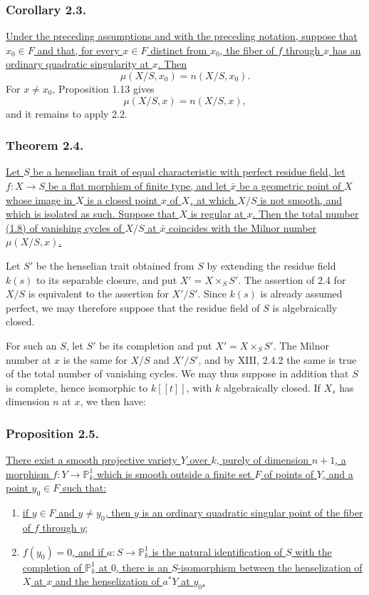 \subsubsection*{Corollary 2.3.}
\underline{Under the preceding assumptions and with the preceding
notation, suppose that $x_0\in F$ and that, for every
$x\in F$ distinct from $x_0$, the fiber of $f$ through $x$ has an
ordinary quadratic singularity at $x$.  Then}
\[
\mu(X/S,x_0)=n(X/S,x_0).
\]
For $x\ne x_0$, Proposition 1.13 gives
\[
\mu(X/S,x)=n(X/S,x),
\]
and it remains to apply 2.2.

\subsubsection*{Theorem 2.4.}
\underline{Let $S$ be a henselian trait of equal characteristic with
perfect residue field, let $f:X\to S$ be a flat morphism of finite
type, and let $\bar x$ be a geometric point of $X$ whose image in
$X$ is a closed point $x$ of $X_s$ at which $X/S$ is not smooth,
and which is isolated as such.  Suppose that $X$ is regular at $x$.
Then the total number (1.8) of vanishing cycles of $X/S$ at $\bar x$
coincides with the Milnor number $\mu(X/S,x)$.}

Let $S'$ be the henselian trait obtained from $S$ by extending the
residue field $k(s)$ to its separable closure, and put
$X'=X\times_S S'$.  The assertion of 2.4 for $X/S$ is equivalent to
the assertion for $X'/S'$.  Since $k(s)$ is already assumed perfect,
we may therefore suppose that the residue field of $S$ is
algebraically closed.

For such an $S$, let $S'$ be its completion and put
$X'=X\times_S S'$.  The Milnor number at $x$ is the same for $X/S$
and $X'/S'$, and by XIII, 2.4.2 the same is true of the total number
of vanishing cycles.  We may thus suppose in addition that $S$ is
complete, hence isomorphic to $k[[t]]$, with $k$ algebraically
closed.  If $X_s$ has dimension $n$ at $x$, we then have:

\subsubsection*{Proposition 2.5.}
\underline{There exist a smooth projective variety $Y$ over $k$,
purely of dimension $n+1$, a morphism
$f:Y\to\mathbb P^1_k$ which is smooth outside a finite set $F$ of
points of $Y$, and a point $y_0\in F$ such that:}
\begin{enumerate}
\item[(a)] \underline{if $y\in F$ and $y\ne y_0$, then $y$ is an
ordinary quadratic singular point of the fiber of $f$ through $y$;}
\item[(b)] \underline{$f(y_0)=0$, and if
$a:S\to\mathbb P^1_k$ is the natural identification of $S$ with the
completion of $\mathbb P^1_k$ at $0$, there is an $S$-isomorphism
between the henselization of $X$ at $x$ and the henselization of
$a^*Y$ at $y_0$.}
\end{enumerate}


